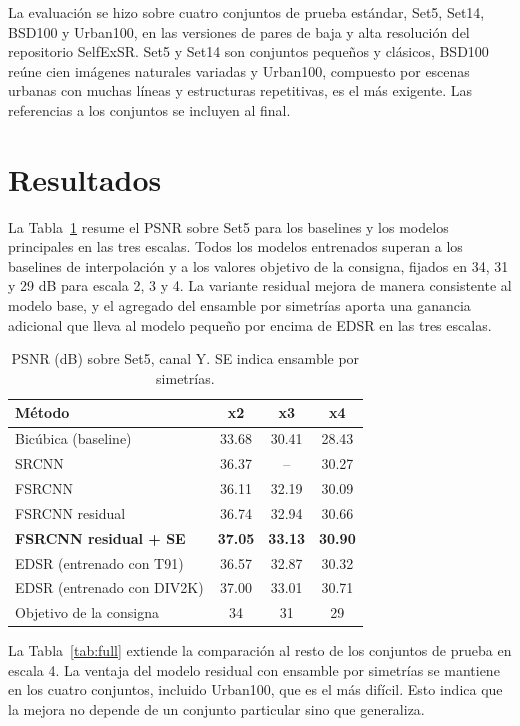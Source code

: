 \documentclass[conference]{IEEEtran}
\begin{document}
La evaluación se hizo sobre cuatro conjuntos de prueba estándar, Set5, Set14, BSD100 y Urban100,
en las versiones de pares de baja y alta resolución del repositorio SelfExSR. Set5 y Set14 son
conjuntos pequeños y clásicos, BSD100 reúne cien imágenes naturales variadas y Urban100, compuesto
por escenas urbanas con muchas líneas y estructuras repetitivas, es el más exigente. Las
referencias a los conjuntos se incluyen al final.

\section{Resultados}
La Tabla~\ref{tab:psnr} resume el PSNR sobre Set5 para los baselines y los modelos principales en
las tres escalas. Todos los modelos entrenados superan a los baselines de interpolación y a los
valores objetivo de la consigna, fijados en 34, 31 y 29 dB para escala 2, 3 y 4. La variante
residual mejora de manera consistente al modelo base, y el agregado del ensamble por simetrías
aporta una ganancia adicional que lleva al modelo pequeño por encima de EDSR en las tres escalas.

\begin{table}[!htb]
\caption{PSNR (dB) sobre Set5, canal Y. SE indica ensamble por simetrías.}
\label{tab:psnr}
\centering
\begin{tabular}{lccc}
\toprule
Método & x2 & x3 & x4 \\
\midrule
Bicúbica (baseline) & 33.68 & 30.41 & 28.43 \\
SRCNN & 36.37 & -- & 30.27 \\
FSRCNN & 36.11 & 32.19 & 30.09 \\
FSRCNN residual & 36.74 & 32.94 & 30.66 \\
\textbf{FSRCNN residual + SE} & \textbf{37.05} & \textbf{33.13} & \textbf{30.90} \\
EDSR (entrenado con T91) & 36.57 & 32.87 & 30.32 \\
EDSR (entrenado con DIV2K) & 37.00 & 33.01 & 30.71 \\
\midrule
Objetivo de la consigna & 34 & 31 & 29 \\
\bottomrule
\end{tabular}
\end{table}

La Tabla~\ref{tab:full} extiende la comparación al resto de los conjuntos de prueba en escala 4. La
ventaja del modelo residual con ensamble por simetrías se mantiene en los cuatro conjuntos,
incluido Urban100, que es el más difícil. Esto indica que la mejora no depende de un conjunto
particular sino que generaliza.
\end{document}
